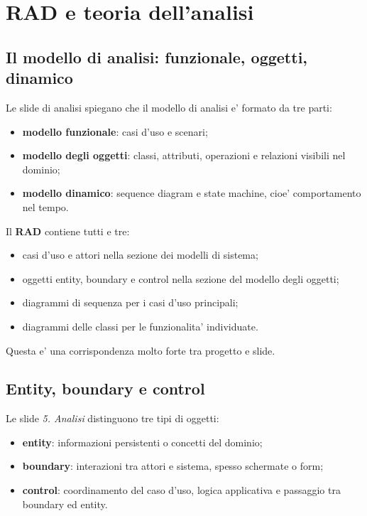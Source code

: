 ﻿\documentclass[11pt,a4paper]{article}
\newcommand{\doc}[1]{\textbf{#1}}
\newcommand{\slide}[1]{\emph{#1}}
\newcommand{\term}[1]{\textbf{#1}}
\begin{document}
\section{RAD e teoria dell'analisi}

\subsection{Il modello di analisi: funzionale, oggetti, dinamico}

Le slide di analisi spiegano che il modello di analisi e' formato da tre parti:
\begin{itemize}
  \item \term{modello funzionale}: casi d'uso e scenari;
  \item \term{modello degli oggetti}: classi, attributi, operazioni e relazioni visibili
  nel dominio;
  \item \term{modello dinamico}: sequence diagram e state machine, cioe' comportamento
  nel tempo.
\end{itemize}

Il \doc{RAD} contiene tutti e tre:
\begin{itemize}
  \item casi d'uso e attori nella sezione dei modelli di sistema;
  \item oggetti entity, boundary e control nella sezione del modello degli oggetti;
  \item diagrammi di sequenza per i casi d'uso principali;
  \item diagrammi delle classi per le funzionalita' individuate.
\end{itemize}

Questa e' una corrispondenza molto forte tra progetto e slide.

\subsection{Entity, boundary e control}

Le slide \slide{5. Analisi} distinguono tre tipi di oggetti:
\begin{itemize}
  \item \term{entity}: informazioni persistenti o concetti del dominio;
  \item \term{boundary}: interazioni tra attori e sistema, spesso schermate o form;
  \item \term{control}: coordinamento del caso d'uso, logica applicativa e passaggio tra
  boundary ed entity.
\end{itemize}
\end{document}
